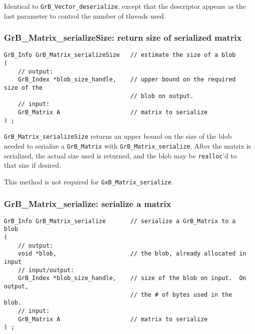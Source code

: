 \documentclass[12pt]{article}
\begin{document}
Identical to \verb'GrB_Vector_deserialize', except that the descriptor
appears as the last parameter to control the number of threads used.

\newpage
\subsubsection{{\sf GrB\_Matrix\_serializeSize:}  return size of serialized matrix}
\label{matrix_serialize_size}

\begin{mdframed}[userdefinedwidth=6in]
{\footnotesize
\begin{verbatim}
GrB_Info GrB_Matrix_serializeSize   // estimate the size of a blob
(
    // output:
    GrB_Index *blob_size_handle,    // upper bound on the required size of the
                                    // blob on output.
    // input:
    GrB_Matrix A                    // matrix to serialize
) ;
\end{verbatim}
} \end{mdframed}

\verb'GrB_Matrix_serializeSize' returns an upper bound on the size of the blob
needed to serialize a \verb'GrB_Matrix' with \verb'GrB_Matrix_serialize'.
After the matrix is serialized, the actual size used is returned, and the blob
may be \verb'realloc''d to that size if desired.

This method is not required for \verb'GxB_Matrix_serialize'.

\subsubsection{{\sf GrB\_Matrix\_serialize:}      serialize a matrix}
\label{matrix_serialize}

\begin{mdframed}[userdefinedwidth=6in]
{\footnotesize
\begin{verbatim}
GrB_Info GrB_Matrix_serialize       // serialize a GrB_Matrix to a blob
(
    // output:
    void *blob,                     // the blob, already allocated in input
    // input/output:
    GrB_Index *blob_size_handle,    // size of the blob on input.  On output,
                                    // the # of bytes used in the blob.
    // input:
    GrB_Matrix A                    // matrix to serialize
) ;
\end{verbatim}
} \end{mdframed}
\end{document}
